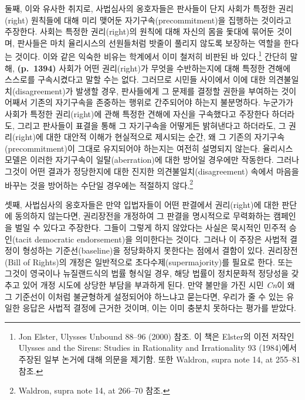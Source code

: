 \documentclass[a4paper,12pt,oneside]{article}  %
\begin{document}
둘째, 이와 유사한 취지로, 사법심사의 옹호자들은 판사들이 단지 사회가
특정한 권리(right) 원칙들에 대해 미리 맺어둔 자기구속(precommitment)을
집행하는 것이라고 주장한다. 사회는 특정한 권리(right)의 원칙에 대해
자신의 몸을 돛대에 묶어둔 것이며, 판사들은 마치 율리시스의 선원들처럼
밧줄이 풀리지 않도록 보장하는 역할을 한다는 것이다. 이와 같은 익숙한
비유는 학계에서 이미 철저히 비판된 바 있다.\footnote{Jon Elster, Ulysses
  Unbound 88--96 (2000) 참조. 이 책은 Elster의 이전 저작인 Ulysses and
  the Sirens: Studies in Rationality and Irrationality 93 (1984)에서
  주장된 일부 논거에 대해 의문을 제기함. 또한 Waldron, supra note 14, at
  255--81 참조.} 간단히 말해, \textbf{(p.~1394)} 사회가 어떤
권리(right)가 무엇을 수반하는지에 대해 특정한 견해에 스스로를
구속시켰다고 말할 수는 없다. 그러므로 시민들 사이에서 이에 대한
의견불일치(disagreement)가 발생할 경우, 판사들에게 그 문제를 결정할
권한을 부여하는 것이 어째서 기존의 자기구속을 존중하는 행위로 간주되어야
하는지 불분명하다. 누군가가 사회가 특정한 권리(right)에 관해 특정한
견해에 자신을 구속했다고 주장한다 하더라도, 그리고 판사들이 표결을 통해
그 자기구속을 어떻게든 밝혀낸다고 하더라도, 그 권리(right)에 대한 대안적
이해가 현실적으로 제시되는 순간, 왜 그 기존의 자기구속(precommitment)이
그대로 유지되어야 하는지는 여전히 설명되지 않는다. 율리시스 모델은
이러한 자기구속이 일탈(aberration)에 대한 방어일 경우에만 작동한다.
그러나 그것이 어떤 결과가 정당한지에 대한 진지한
의견불일치(disagreement) 속에서 마음을 바꾸는 것을 방어하는 수단일
경우에는 적절하지 않다.\footnote{Waldron, supra note 14, at 266--70
  참조.}

셋째, 사법심사의 옹호자들은 만약 입법자들이 어떤 판결에서 권리(right)에
대한 판단에 동의하지 않는다면, 권리장전을 개정하여 그 판결을 명시적으로
무력화하는 캠페인을 벌일 수 있다고 주장한다. 그들이 그렇게 하지 않았다는
사실은 묵시적인 민주적 승인(tacit democratic endorsement)을 의미한다는
것이다. 그러나 이 주장은 사법적 결정이 형성하는 기준선(baseline)을
정당화하지 못한다는 점에서 결함이 있다. 권리장전(Bill of Rights)의
개정은 일반적으로 초다수제(supermajority)를 필요로 한다. 또는 그것이
영국이나 뉴질랜드식의 법률 형식일 경우, 해당 법률이 정치문화적 정당성을
갖추고 있어 개정 시도에 상당한 부담을 부과하게 된다. 만약 불만을 가진
시민 \emph{Cn}이 왜 그 기준선이 이처럼 불균형하게 설정되어야 하느냐고 묻는다면,
우리가 줄 수 있는 유일한 응답은 사법적 결정에 근거한 것이며, 이는 이미
충분치 못하다는 평가를 받았다.
\end{document}
